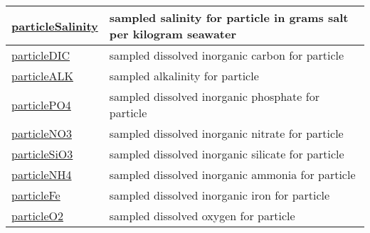 {\begin{center}
\begin{longtable}{| p{2.0in} | p{4.0in} |}
    \hline
    \hyperref[subsec:var_sec_lagrPartTrackHalo_particleSalinity]{particleSalinity} & sampled salinity for particle in grams salt per kilogram seawater \\
    \hline
    \hyperref[subsec:var_sec_lagrPartTrackHalo_particleDIC]{particleDIC} & sampled dissolved inorganic carbon for particle \\
    \hline
    \hyperref[subsec:var_sec_lagrPartTrackHalo_particleALK]{particleALK} & sampled alkalinity for particle \\
    \hline
    \hyperref[subsec:var_sec_lagrPartTrackHalo_particlePO4]{particlePO4} & sampled dissolved inorganic phosphate for particle \\
    \hline
    \hyperref[subsec:var_sec_lagrPartTrackHalo_particleNO3]{particleNO3} & sampled dissolved inorganic nitrate for particle \\
    \hline
    \hyperref[subsec:var_sec_lagrPartTrackHalo_particleSiO3]{particleSiO3} & sampled dissolved inorganic silicate for particle \\
    \hline
    \hyperref[subsec:var_sec_lagrPartTrackHalo_particleNH4]{particleNH4} & sampled dissolved inorganic ammonia for particle \\
    \hline
    \hyperref[subsec:var_sec_lagrPartTrackHalo_particleFe]{particleFe} & sampled dissolved inorganic iron for particle \\
    \hline
    \hyperref[subsec:var_sec_lagrPartTrackHalo_particleO2]{particleO2} & sampled dissolved oxygen for particle \\
    \hline
\end{longtable}
\end{center}
}
